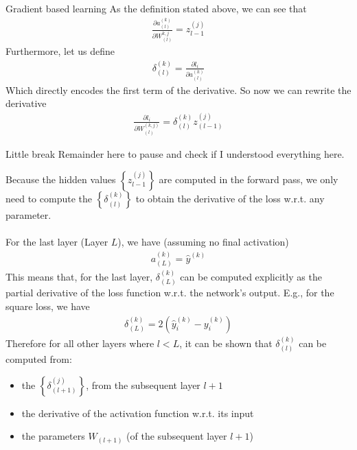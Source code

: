\begin{parag}{Gradient based learning}
	As the definition stated above, we can see that 
	\begin{align*} 
		\frac{\partial a_{\left(l\right)}^{\left(k\right)}}{\partial W_{\left(l\right)}^{k, j}} = z_{l - 1}^{\left(j\right)}
	\end{align*}
	Furthermore, let us define 
	\begin{align*} 
		\delta_{\left(l\right)}^{\left(k\right)} =  \frac{\partial l_i}{\partial a_{\left(l\right)}^{\left(k\right)}} 
	\end{align*}
	Which directly encodes the first term of the derivative. So now we can rewrite the derivative 
	\begin{align*} 
		\frac{\partial l_i}{\partial W_{\left(l\right)}^{\left(k, j\right)}}  = \delta_{\left(l\right)}^{\left(k\right)}z_{\left(l-1\right)}^{\left(j\right)}
	\end{align*}
	\begin{subparag}{Little break}
		Remainder here to pause and check if I understood everything here.
	\end{subparag}
	Because the hidden values $\left\{z_{l -1}^{\left(j\right)}\right\}$ are computed in the forward pass, we only need to compute the $\left\{\delta_{\left(l\right)}^{\left(k\right)}\right\}$ to obtain the derivative of the loss w.r.t. any parameter.\\
	$ $\\
	For the last layer (Layer $L$), we have (assuming no final activation)
	\begin{align*} 
		a_{\left(L\right)}^{\left(k\right)} = \hat{y}^{\left(k\right)}
	\end{align*}
	This means that, for the last layer, $\delta_{\left(L\right)}^{\left(k\right)}$ can be computed explicitly as the partial derivative of the loss function w.r.t. the network's output. E.g., for the square loss, we have 
	\begin{align*} 
		\delta_{\left(L\right)}^{\left(k\right)} =  2\left(\hat{y}_i^{\left(k\right)} - y_i^{\left(k\right)}\right)
	\end{align*}
	Therefore for all other layers where $l < L$, it can be shown that $\delta_{\left(l\right)}^{\left(k\right)}$ can be computed from:
	\begin{itemize}
	    \item the $\left\{\delta_{\left(l + 1\right)}^{\left(j\right)}\right\}$, from the subsequent layer $l + 1$ 
	    \item the derivative of the activation function w.r.t. its input
	    \item the parameters $W_{\left(l + 1\right)}$ (of the subsequent layer $l + 1$)

\end{itemize}
\end{parag}
